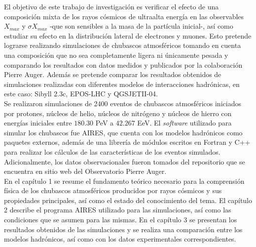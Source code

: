 El objetivo de este trabajo de investigación es verificar el efecto de una composición mixta de los rayos cósmicos de ultraalta energía en las observables $X_{max}$ y $\sigma X_{max}$ -que son sensibles a la masa de la partícula inicial-, así como estudiar su efecto en la distribución lateral de electrones y muones. Esto pretende lograrse realizando simulaciones de chubascos atmosféricos tomando en cuenta una composición que no sea completamente ligera ni únicamente pesada y comparando los resultados con datos medidos y publicados por la colaboración Pierre Auger. Además se pretende comparar los resultados obtenidos de simulaciones realizadas con diferentes modelos de interacciones hadrónicas, en este caso: Sibyll 2.3c, EPOS-LHC y QGSJETII-04. \\

Se realizaron simulaciones de 2400 eventos de chubascos atmosféricos iniciados por protones, núcleos de helio, núcleos de nitrógeno y núcleos de hierro con energías iniciales entre $180.30$ PeV a $42.267$ EeV. El \textit{software} utilizado para simular los chubascos fue AIRES, que cuenta con los modelos hadrónicos como paquetes externos, además de una librería de módulos escritos en Fortran y C++ para realizar los cálculos de las características de los eventos simulados. Adicionalmente, los datos observacionales fueron tomados del repositorio que se encuentra en sitio web del Observatorio Pierre Auger. \\

En el capítulo 1 se resume el fundamento teórico necesario para la comprensión física de los chubascos atmosféricos producidos por rayos cósmicos y sus propiedades principales, así como el estado del conocimiento del tema. El capítulo 2 describe el programa AIRES utilizado para las simulaciones, así como las condiciones que se asumen para las mismas. En el capítulo 3 se presentan los resultados obtenidos de las simulaciones y se realiza una comparación entre los modelos hadrónicos, así como con los datos experimentales correspondientes.




\singlespace